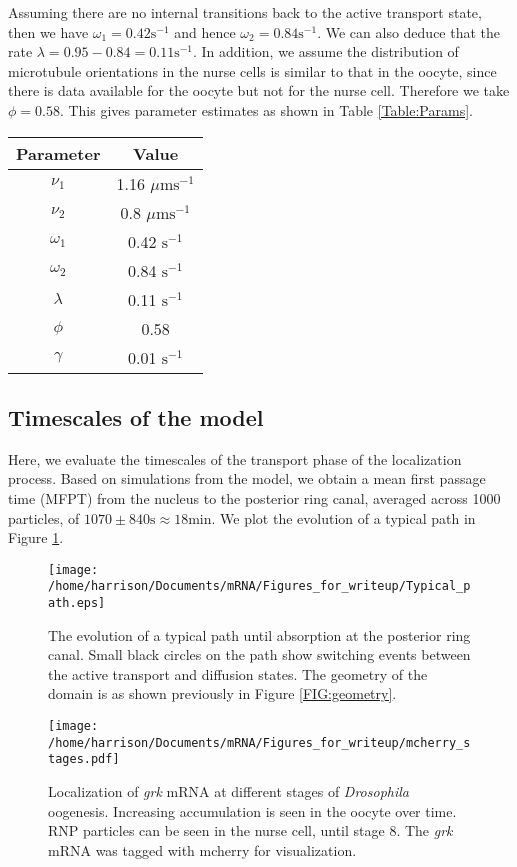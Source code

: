 \documentclass[twocolumn]{biophys}
\begin{document}
Assuming there are no internal transitions back to the active transport state, then we have $\omega_1 = 0.42 \text{s}^{-1}$ and hence $\omega_2 = 0.84 \text{s}^{-1}$. 
We can also deduce that the rate $\lambda = 0.95-0.84 = 0.11 \text{s}^{-1}$.  
In addition, we assume the distribution of microtubule orientations in the nurse cells is similar to that in the oocyte, since there is data available for the oocyte \citep{parton20111} but not for the nurse cell. 
Therefore we take $\phi = 0.58$.
This gives parameter estimates as shown in Table \ref{Table:Params}.
\begin{center}

 \begin{tabular}{| c | c |}
   \hline
   Parameter & Value \\ \hline
   $\nu_1$ & 1.16 $\mu \text{ms}^{-1}$ \\ %
   $\nu_2$ & 0.8 $\mu \text{ms}^{-1}$ \\ %
   $\omega_1$ & 0.42 $\text{s}^{-1}$ \\ %
   $\omega_2$ & 0.84 $\text{s}^{-1}$ \\ %
   $\lambda$ & 0.11 $\text{s}^{-1}$ \\ %
   $\phi$ & 0.58 \\ %
   $\gamma$ & 0.01 $\text{s}^{-1}$ \\
   \hline 
 \end{tabular}

 \end{center}
  \label{Table:Params}

\subsection{Timescales of the model}
Here, we evaluate the timescales of the transport phase of the localization process.
Based on simulations from the model, we obtain a mean first passage time (MFPT) from the nucleus to the posterior ring canal, averaged across 1000 particles, of $1070 \pm 840 \text{s} \approx 18 \text{min}$.
We plot the evolution of a typical path in Figure \ref{FIG:Typical_path}.
\begin{figure}[h]
 \centering
 \texttt{[image: /home/harrison/Documents/mRNA/Figures\_for\_writeup/Typical\_path.eps]}
 \caption{\small The evolution of a typical path until absorption at the posterior ring canal. 
 Small black circles on the path show switching events between the active transport and diffusion states. 
 The geometry of the domain is as shown previously in Figure \ref{FIG:geometry}.}
 \label{FIG:Typical_path}
\end{figure}
\begin{figure*}
 \centering
 \texttt{[image: /home/harrison/Documents/mRNA/Figures\_for\_writeup/mcherry\_stages.pdf]}
 \caption{\small Localization of \textit{grk} mRNA at different stages of \textit{Drosophila} oogenesis. Increasing accumulation is seen in the oocyte over time. RNP particles can be seen in the nurse cell, until stage 8. The \textit{grk} mRNA was tagged with mcherry for visualization.}
 \label{FIG:grk_localization}
\end{figure*}
\end{document}

